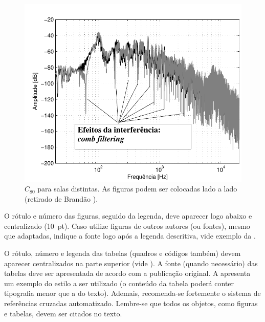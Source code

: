 \documentclass[12pt, a4paper, twoside, twocolumn]{article}
\begin{document}
\begin{figure}[H]
	\centering \vspace{-3mm}
        \includegraphics[width=0.98\linewidth,page=1]{Figuras/Combfilter-Brandao-2017.pdf}
        \caption{$C_{80}$ para salas distintas. As figuras podem ser colocadas lado a lado (retirado de Brandão \cite{Brandao-2017}).}
	\label{fig:C80}%
\end{figure}
%
\vspace{-3mm}
O rótulo e número das figuras, seguido da legenda, deve aparecer logo abaixo e centralizado (10~pt). Caso utilize figuras de outros autores (ou fontes), mesmo que adaptadas, indique a fonte logo após a legenda descritiva, vide exemplo da .

O rótulo, número e legenda das tabelas (quadros e códigos também) devem aparecer centralizados na parte superior (vide ). A fonte (quando necessário) das tabelas deve ser apresentada de acordo com a publicação original. A  apresenta um exemplo do estilo a ser utilizado (o conteúdo da tabela poderá conter tipografia menor que a do texto). Ademais, recomenda-se fortemente o sistema de referências cruzadas automatizado. Lembre-se que todos os objetos, como figuras e tabelas, devem ser citados no texto.
%

%
\end{document}
